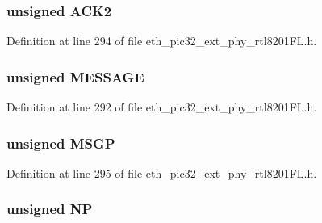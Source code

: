 \subsubsection[{A\+C\+K2}]{\setlength{\rightskip}{0pt plus 5cm}unsigned A\+C\+K2}\label{union_____a_n_l_p_r_n_pbits__t_a04eefaff71d440a3996c7db3676475ba}


Definition at line 294 of file eth\+\_\+pic32\+\_\+ext\+\_\+phy\+\_\+rtl8201\+F\+L.\+h.

\hypertarget{union_____a_n_l_p_r_n_pbits__t_a06361005f0d2faefe34e0bdb1499bfe7}{}
\subsubsection[{M\+E\+S\+S\+A\+G\+E}]{\setlength{\rightskip}{0pt plus 5cm}unsigned M\+E\+S\+S\+A\+G\+E}\label{union_____a_n_l_p_r_n_pbits__t_a06361005f0d2faefe34e0bdb1499bfe7}


Definition at line 292 of file eth\+\_\+pic32\+\_\+ext\+\_\+phy\+\_\+rtl8201\+F\+L.\+h.

\hypertarget{union_____a_n_l_p_r_n_pbits__t_a8c958300dd9e82d064f59696a78d8e45}{}
\subsubsection[{M\+S\+G\+P}]{\setlength{\rightskip}{0pt plus 5cm}unsigned M\+S\+G\+P}\label{union_____a_n_l_p_r_n_pbits__t_a8c958300dd9e82d064f59696a78d8e45}


Definition at line 295 of file eth\+\_\+pic32\+\_\+ext\+\_\+phy\+\_\+rtl8201\+F\+L.\+h.

\hypertarget{union_____a_n_l_p_r_n_pbits__t_ac89729be1dc289730931f8238a316516}{}
\subsubsection[{N\+P}]{\setlength{\rightskip}{0pt plus 5cm}unsigned N\+P}\label{union_____a_n_l_p_r_n_pbits__t_ac89729be1dc289730931f8238a316516}


